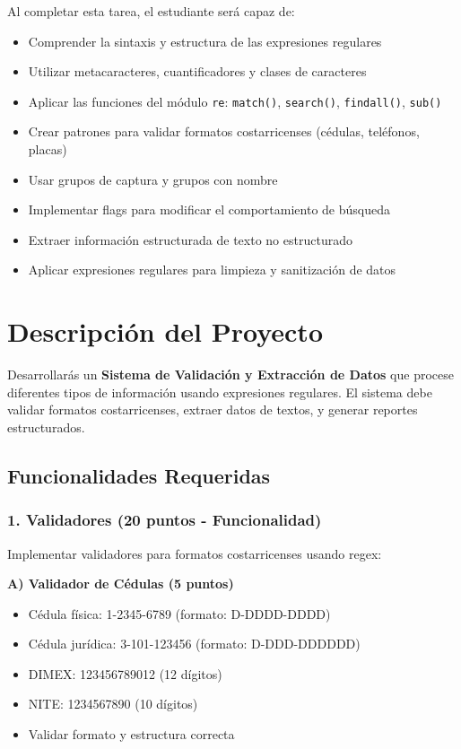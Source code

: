 \documentclass[11pt,letterpaper]{article}
\begin{document}
Al completar esta tarea, el estudiante será capaz de:

\begin{itemize}
    \item Comprender la sintaxis y estructura de las expresiones regulares
    \item Utilizar metacaracteres, cuantificadores y clases de caracteres
    \item Aplicar las funciones del módulo \texttt{re}: \texttt{match()}, \texttt{search()}, \texttt{findall()}, \texttt{sub()}
    \item Crear patrones para validar formatos costarricenses (cédulas, teléfonos, placas)
    \item Usar grupos de captura y grupos con nombre
    \item Implementar flags para modificar el comportamiento de búsqueda
    \item Extraer información estructurada de texto no estructurado
    \item Aplicar expresiones regulares para limpieza y sanitización de datos
\end{itemize}

\section{Descripción del Proyecto}

Desarrollarás un \textbf{Sistema de Validación y Extracción de Datos} que procese diferentes tipos de información usando expresiones regulares. El sistema debe validar formatos costarricenses, extraer datos de textos, y generar reportes estructurados.

\subsection{Funcionalidades Requeridas}

\subsubsection{1. Validadores (20 puntos - Funcionalidad)}

Implementar validadores para formatos costarricenses usando regex:

\textbf{A) Validador de Cédulas (5 puntos)}
\begin{itemize}
    \item Cédula física: 1-2345-6789 (formato: D-DDDD-DDDD)
    \item Cédula jurídica: 3-101-123456 (formato: D-DDD-DDDDDD)
    \item DIMEX: 123456789012 (12 dígitos)
    \item NITE: 1234567890 (10 dígitos)
    \item Validar formato y estructura correcta
\end{itemize}
\end{document}
